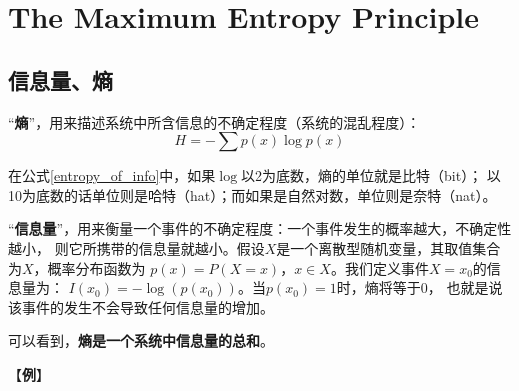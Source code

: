 ﻿
\section{The Maximum Entropy Principle}

\subsection{信息量、熵}

“{\bf 熵}”，用来描述系统中所含信息的不确定程度（系统的混乱程度）：
\begin{equation}\label{entropy_of_info}
H = - \sum p(x) \log p(x)
\end{equation}

在公式\eqref{entropy_of_info}中，如果$\log$以2为底数，熵的单位就是比特（bit）；
以10为底数的话单位则是哈特（hat）；而如果是自然对数，单位则是奈特（nat）。

“{\bf 信息量}”，用来衡量一个事件的不确定程度：一个事件发生的概率越大，不确定性越小，
则它所携带的信息量就越小。假设$X$是一个离散型随机变量，其取值集合为$X$，概率分布函数为
$p(x)=P(X=x)$，$x\in X$。我们定义事件$X=x_0$的信息量为：
$I(x_0) = -\log(p(x_0))$。当$p(x_0)=1$时，熵将等于$0$，
也就是说该事件的发生不会导致任何信息量的增加。

可以看到，{\bf 熵是一个系统中信息量的总和}。

【{\bf 例}】

